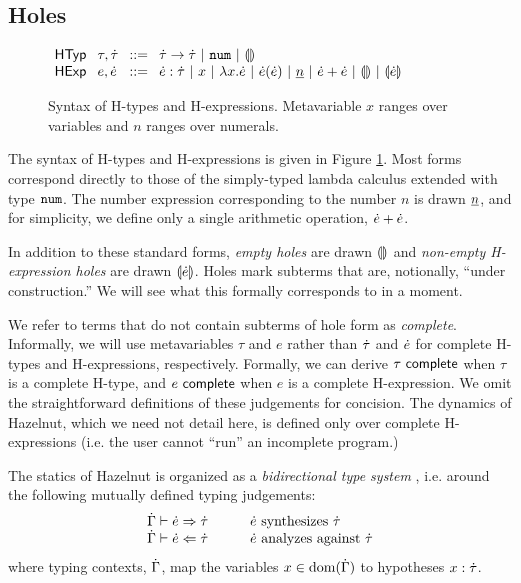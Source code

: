 \documentclass{llncs}
\begin{document}
\subsection{Holes}\label{sec:holes}
\begin{figure}[t]
$\arraycolsep=4pt\begin{array}{lllllll}
\mathsf{HTyp} & \tau,\htau & ::= &
  \tarr{\htau}{\htau} ~\vert~
  \tnum ~\vert~
  \tehole\\
\mathsf{HExp} & e,\hexp & ::= &
  \hexp : \htau ~\vert~
  x ~\vert~
  \hlam{x}{\hexp} ~\vert~
  \hap{\hexp}{\hexp} ~\vert~
  \hnum{n} ~\vert~
  \hadd{\hexp}{\hexp} ~\vert~
  \hehole ~\vert~
  \hhole{\hexp}
\end{array}$
\caption{Syntax of H-types and H-expressions. Metavariable $x$ ranges over variables and $n$ ranges over numerals.}
\label{fig:hexp-syntax}
\end{figure}

The syntax of H-types and H-expressions is given in Figure \ref{fig:hexp-syntax}. Most forms correspond directly to those of the simply-typed lambda calculus extended with type $\texttt{num}$. The number expression corresponding to the number $n$ is drawn $\underline{n}$, and for simplicity, we define only a single arithmetic operation, $\dot{e} + \dot{e}$.

In addition to these standard forms, \emph{empty holes} are drawn $\llparenthesis\rrparenthesis$ and \emph{non-empty H-expression holes} are drawn $\llparenthesis\dot{e}\rrparenthesis$. Holes mark subterms that are, notionally, ``under construction.'' We will see what this formally corresponds to in a moment.

We refer to terms that do not contain subterms of hole form as \emph{complete}. Informally, we will use metavariables $\tau$ and $e$ rather than $\dot{\tau}$ and $\dot{e}$ for complete H-types and H-expressions, respectively. Formally, we can derive $\tau~\mathsf{complete}$ when $\tau$ is a complete H-type, and $e~\mathsf{complete}$ when $e$ is a complete H-expression. We omit the straightforward definitions of these judgements for concision. The dynamics of Hazelnut, which we need not detail here, is defined only  over complete H-expressions (i.e. the user cannot ``run'' an incomplete program.)

The statics of Hazelnut is organized as a \emph{bidirectional type system} \cite{Pierce:2000:LTI:345099.345100}, i.e. around the following mutually defined typing judgements:
\[\arraycolsep=15pt\begin{array}{ll}
\hsyn{\hGamma}{\hexp}{\htau} & \text{$\hexp$ synthesizes $\htau$}\\
\hana{\hGamma}{\hexp}{\htau} & \text{$\hexp$ analyzes against $\htau$}
\end{array}\]
where typing contexts, $\dot{\Gamma}$, map the variables $x \in \text{dom}(\dot{\Gamma})$ to hypotheses $x : \dot{\tau}$.
\end{document}
